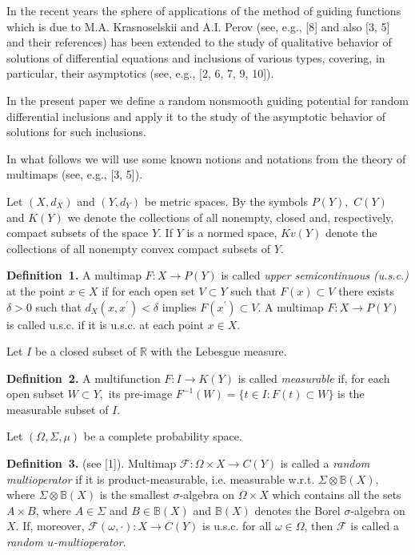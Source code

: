 
\vzmscaption

In the recent years the sphere of applications of the method of guiding functions which is due to M.A. Krasnoselskii and A.I. Perov (see, e.g., [8] and also [3, 5] and their references) has been extended to the study of qualitative behavior of solutions of differential equations and inclusions of various types, covering, in particular, their asymptotics (see, e.g., [2, 6, 7, 9, 10]).

In the present paper we define a random nonsmooth guiding potential for random differential inclusions and apply it to the study of the asymptotic behavior of solutions for such inclusions.

In what follows we will use some known notions and notati\-ons from the theory of multimaps (see, e.g., [3, 5]).

Let $(X,d_X)$ and $(Y,d_Y)$ be metric spaces. By the symbols $P(Y),$ $C(Y)$ and $K(Y)$ we denote the collections of all nonempty, closed and, respectively, compact subsets of the space $Y.$ If $Y$ is a normed space, $Kv(Y)$ denote the collections of all nonempty convex compact subsets of $Y.$

\textbf{Definition~1.}
A multimap $F:X \to P(Y)$ is called {\it upper semicontinuous (u.s.c.)} at the point $x\in X$ if for each open set $V \subset Y$ such that $F(x) \subset V$ there exists $\delta >0$ such that $d_X(x,x^\prime)<\delta$ implies $F(x^\prime)\subset V.$ A multimap $F:X \to P(Y)$ is called u.s.c. if it is u.s.c. at each point $x\in X.$

Let $I$ be a closed subset of $\mathbb{R}$ with the Lebesgue measure.

\textbf{Definition~2.}
A multifunction $F:I \to K(Y)$ is called {\it measurable} if, for each open subset $W \subset Y,$ its pre-image \linebreak
$F^{-1}(W)=\{t\in I:F(t)\subset W\}$ is the measurable subset of $I$.

Let $(\Omega,\Sigma,\mu)$ be a complete probability space.

\textbf{Definition~3.} (see [1]). Multimap $\mathcal{F}\colon\Omega\times X\to C(Y)$ is called a {\it random multioperator} if it is product-measurable, i.e. measurable w.r.t. $\Sigma\otimes\mathbb{B}(X)$, where $\Sigma\otimes\mathbb{B}(X)$ is the smallest
$\sigma$-algebra on $\Omega\times X$ which contains all the sets $A\times B$, where $A\in\Sigma$ and $B\in\mathbb{B}(X)$ and
$\mathbb{B}(X)$ denotes the Borel $\sigma$-algebra on $X$. If, moreover, $\mathcal{F}(\omega,\cdot)\colon X\to C(Y)$ is u.s.c. for all
$\omega\in\Omega$, then $\mathcal{F}$ is called a {\it random $u$-multioperator}.

